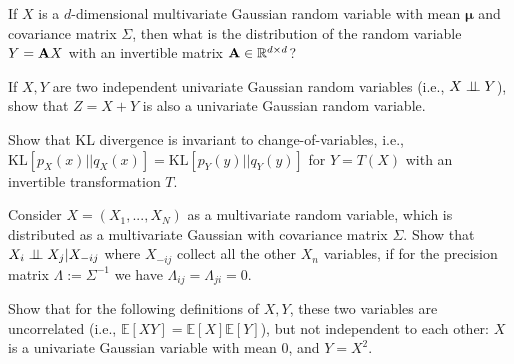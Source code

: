 \begin{question} 
\label{q:linear_transform_gaussian}

If $X$ is a $d$-dimensional multivariate Gaussian random variable with mean $\bm{\mu}$ and covariance matrix $\Sigma$, then what is the distribution of the random variable $Y = \mathbf A X$ with an invertible matrix $\mathbf A \in \mathbb{R}^{d \times d}$? 
\end{question}

\begin{question}
\label{q:sum_of_gaussians}

If $X, Y$ are two independent univariate Gaussian random variables (i.e., $X \perp\!\!\!\perp Y$), show that $Z = X+Y$ is also a univariate Gaussian random variable.
\end{question}

\begin{question}
\label{q:kl_change_of_variable}

Show that KL divergence is invariant to change-of-variables, i.e., $\mathrm{KL}[p_X(x) || q_X(x)] = \mathrm{KL}[p_Y(y) || q_Y(y)]$ for $Y = T(X)$ with an invertible transformation $T$.
\end{question}

\begin{question}
\label{q:independence_of_gaussians}

Consider $X = (X_1, ..., X_N)$ as a multivariate random variable, which is distributed as a multivariate Gaussian with covariance matrix $\Sigma$. Show that $X_i \perp\!\!\!\perp X_j | X_{-ij}$ where $X_{-ij}$ collect all the other $X_n$ variables, if for the precision matrix $\Lambda := \Sigma^{-1}$ we have $\Lambda_{ij} = \Lambda_{ji} = 0$.
\end{question}

\begin{question}
\label{q:uncorrelated}

Show that for the following definitions of $X, Y$, these two variables are uncorrelated (i.e., $\mathbb{E}[XY] = \mathbb{E}[X]\mathbb{E}[Y]$), but not independent to each other: $X$ is a univariate Gaussian variable with mean 0, and $Y = X^2$. 

\end{question}


